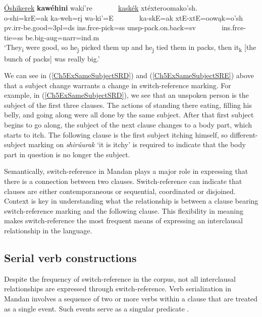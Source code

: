 \begin{exe}
\begin{xlist}
        \item\label{Ch5ExSameSubjectSRE} \glll \uline{Óshikerek} \textbf{kawéhini} wakí're ~ ~ ~ ~ \uline{kaskék} xtéxteroomako'sh.\\
        o-shi=krE=ak ka-weh=rį wa-ki'=E ~ ~ ~ ~ ka-skE=ak xtE-xtE=oowąk=o'sh\\
        pv.irr-\textnormal{be.good}=3pl=ds ins.frce-\textnormal{pick}=ss unsp-\textnormal{pack.on.back}=sv ~ ~ ~ ~ ins.frce-\textnormal{tie}=ss \textnormal{be.big}-aug=narr=ind.m\\
        \glt `They\textsubscript{i} were good, so he\textsubscript{j} picked them up and he\textsubscript{j} tied them in packs, then it\textsubscript{k} [the bunch of packs] was really big.' \citep[216]{hollow1973a}
    \end{xlist}
\end{exe}

We can see in (\ref{Ch5ExSameSubjectSRD}) and (\ref{Ch5ExSameSubjectSRE}) above that a subject change warrants a change in switch-reference marking. For example, in (\ref{Ch5ExSameSubjectSRD}), we see that an unspoken person is the subject of the first three clauses. The actions of standing there eating, filling his belly, and going along were all done by the same subject. After that first subject begins to go along, the subject of the next clause changes to a body part, which starts to itch. The following clause is the first subject itching himself, so different-subject marking on \textit{shirúurak} `it is itchy' is required to indicate that the body part in question is no longer the subject.

Semantically, switch-reference in Mandan plays a major role in expressing that there is a connection between two clauses. Switch-reference can indicate that clauses are either contemporaneous or sequential, coordinated or disjoined. Context is key in understanding what the relationship is between a clause bearing switch-reference marking and the following clause. This flexibility in meaning makes switch-reference the most frequent means of expressing an interclausal relationship in the language.

\subsection{Serial verb constructions}\label{Ch5SerialVerb}

Despite the frequency of switch-reference in the corpus, not all interclausal relationships are expressed through switch-reference. Verb serialization in Mandan involves a sequence of two or more verbs within a clause that are treated as a single event. Such events serve as a singular predicate \citep{aikhenvald2018}.

